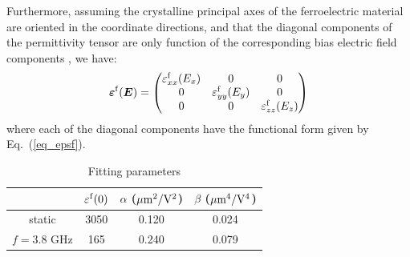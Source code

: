 \documentclass[%
 reprint,
 amsmath,amssymb,
 aps,
]{revtex4-2}
\newcommand{\B}{\boldsymbol}
\newcommand{\tens}[1]{\B{#1}}
\newcommand{\epsf}{\varepsilon^{\rm f}}
\newcommand{\epsftens}{\tens{\varepsilon}^{\rm f}}
\newcommand{\equ}[1]{Eq.~(\ref{#1})}
\begin{document}
Furthermore, assuming the crystalline principal axes of the ferroelectric material
are oriented in the coordinate directions, and that the diagonal components of the permittivity
tensor are only function of the corresponding bias electric field components \cite{Krowne2002}, we have:
\begin{equation}
  \epsftens (\B E) =
\left(
\begin{matrix}
\epsf_{xx}(E_x) & 0 & 0 \cr
0 & \epsf_{yy}(E_y) & 0 \cr
0 & 0 & \epsf_{zz}(E_z) \cr

  \end{matrix}
  \right)
\label{eq_epsftens}
\end{equation}
where each of the diagonal components have the functional form
given by \equ{eq_epsf}.
\begin{table}
  \begin{tabular}{c | ccc}
   & $\epsf(0)$  & $\alpha$ ($\rm \mu m^2/V^2$) & $\beta$ ($\rm \mu m^4/V^4$)\\ \hline
  static & 3050 & 0.120 & 0.024\\ \hline
  $f=3.8$ GHz & 165 & 0.240 & 0.079
  \end{tabular}
  \caption{Fitting parameters}
  \label{table_params_fit}
\end{table}

\end{document}
